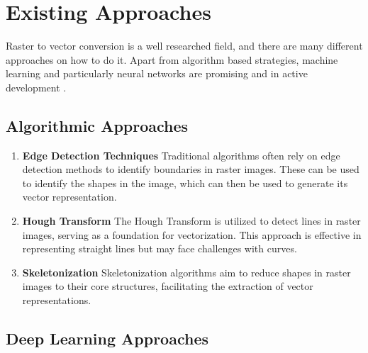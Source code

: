 \documentclass[12pt, a4paper, titlepage]{report}
\begin{document}
\section{Existing Approaches}

Raster to vector conversion is a well researched field, and there are many different approaches on how to do it. Apart from algorithm based strategies, machine learning and particularly neural networks are promising and in active development \cite{dziuba_image_2023}.

\subsection{Algorithmic Approaches}

\begin{enumerate}[label=\Roman*]
   \item \textbf{Edge Detection Techniques} Traditional algorithms often rely on edge detection methods to identify boundaries in raster images. These can be used to identify the shapes in the image, which can then be used to generate its vector representation.

   \item \textbf{Hough Transform} The Hough Transform is utilized to detect lines in raster images, serving as a foundation for vectorization. This approach is effective in representing straight lines but may face challenges with curves.

   \item \textbf{Skeletonization} Skeletonization algorithms aim to reduce shapes in raster images to their core structures, facilitating the extraction of vector representations.
\end{enumerate}

\subsection{Deep Learning Approaches}
\end{document}
